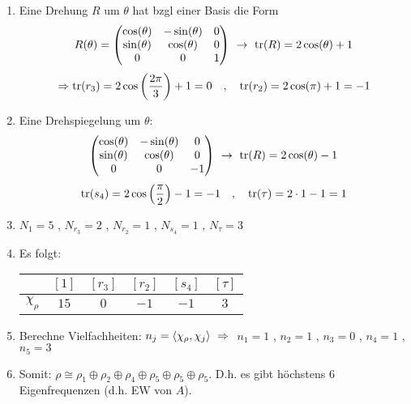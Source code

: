 \begin{enumerate}[]
    \item Eine Drehung $R$ um $\theta$ hat bzgl einer Basis die Form
        \begin{align*}
            R(\theta) =
            \begin{pmatrix}
                \cos(\theta) & - \sin(\theta) & 0 \\
                \sin(\theta) & \cos(\theta) & 0 \\
                0 & 0 & 1
            \end{pmatrix}
            \ \rightarrow \ \text{tr}(R) = 2 \cos(\theta) + 1
        \end{align*}
        \begin{align*}
            \Rightarrow
            \text{tr}(r_3) = 2 \cos \left( \frac{2 \pi}{3} \right) + 1 = 0
            \hspace{10pt} , \hspace{10pt}
            \text{tr}(r_2) = 2 \cos(\pi) + 1 = -1
        \end{align*}
    \item Eine Drehspiegelung um $\theta$:
        \begin{align*}
            \begin{pmatrix}
                \cos(\theta) & - \sin(\theta) & 0 \\
                \sin(\theta) & \cos(\theta) & 0 \\
                0 & 0 & -1
            \end{pmatrix}
            \ \rightarrow \ \text{tr}(R) = 2 \cos(\theta) - 1
        \end{align*}
        \begin{align*}
            \text{tr}(s_4) = 2 \cos \left( \frac{\pi}{2} \right) - 1 = -1
            \hspace{10pt} , \hspace{10pt}
            \text{tr}(\tau) = 2 \cdot 1 - 1 = 1
        \end{align*}
    \item $N_1 = 5$ , $N_{r_3} = 2$ , $N_{r_2} = 1$ , $N_{s_4} = 1$ , $N_\tau = 3$
    \item Es folgt:
        \begin{table}[h]
            \centering
            \begin{tabular}{c|ccccc}
                 & $[1]$ & $[r_3]$ & $[r_2]$ & $[s_4]$ & $[\tau]$ \\ \hline
                $\chi_\rho$ & $15$ & $0$ & $-1$ & $-1$ & $3$ 
            \end{tabular}
        \end{table}
    \item Berechne Vielfachheiten:
        $n_j = \left\langle \chi_\rho , \chi_j \right\rangle \ \Rightarrow \ $
        $n_1 = 1$ , $n_2 = 1$ , $n_3 = 0$ , $n_4 = 1$ , $n_5 = 3$
    \item Somit: $\rho \cong \rho_1 \oplus \rho_2 \oplus \rho_4 \oplus \rho_5 \oplus \rho_5 \oplus \rho_5$.
        D.h. es gibt höchstens $6$ Eigenfrequenzen (d.h. EW von $A$).
\end{enumerate}
